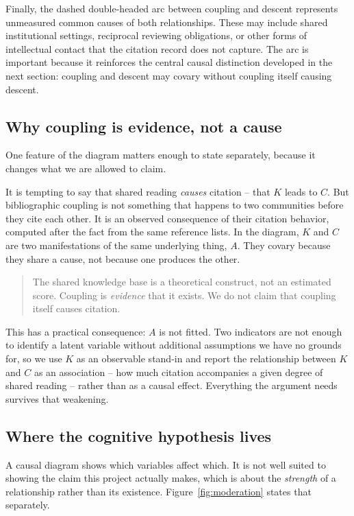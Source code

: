 \documentclass[11pt]{article}
\begin{document}
Finally, the dashed double-headed arc between coupling and descent represents
unmeasured common causes of both relationships. These may include shared
institutional settings, reciprocal reviewing obligations, or other forms of
intellectual contact that the citation record does not capture. The arc is important
because it reinforces the central causal distinction developed in the next section:
coupling and descent may covary without coupling itself causing descent.

\subsection{Why coupling is evidence, not a cause}

One feature of the diagram matters enough to state separately, because it changes what we
are allowed to claim.

It is tempting to say that shared reading \emph{causes} citation -- that $K$ leads to $C$.
But bibliographic coupling is not something that happens to two communities before they
cite each other. It is an observed consequence of their citation behavior, computed after
the fact from the same reference lists. In the diagram, $K$ and $C$ are two manifestations
of the same underlying thing, $A$. They covary because they share a cause, not because one
produces the other.

\begin{quote}
The shared knowledge base is a theoretical construct, not an estimated score. Coupling is
\emph{evidence} that it exists. We do not claim that coupling itself causes citation.
\end{quote}

This has a practical consequence: $A$ is not fitted. Two indicators are not enough to
identify a latent variable without additional assumptions we have no grounds for, so we
use $K$ as an observable stand-in and report the relationship between $K$ and $C$ as an
association -- how much citation accompanies a given degree of shared reading -- rather
than as a causal effect. Everything the argument needs survives that weakening.

\subsection{Where the cognitive hypothesis lives}

A causal diagram shows which variables affect which. It is not well suited to showing the
claim this project actually makes, which is about the \emph{strength} of a relationship
rather than its existence. Figure~\ref{fig:moderation} states that separately.
\end{document}
